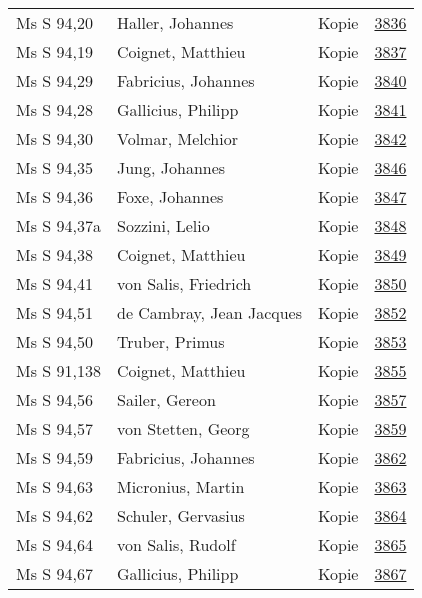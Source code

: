 \documentclass[10pt,a4paper,landscape]{report}
\begin{document}
\begin{longtable}{p{16cm}p{4cm}lr}
Ms S 94,20	&	Haller, Johannes	&	Kopie	&	\href{http://130.60.24.72/assignment/3836}{3836}\\
Ms S 94,19	&	Coignet, Matthieu	&	Kopie	&	\href{http://130.60.24.72/assignment/3837}{3837}\\
Ms S 94,29	&	Fabricius, Johannes	&	Kopie	&	\href{http://130.60.24.72/assignment/3840}{3840}\\
Ms S 94,28	&	Gallicius, Philipp	&	Kopie	&	\href{http://130.60.24.72/assignment/3841}{3841}\\
Ms S 94,30	&	Volmar, Melchior	&	Kopie	&	\href{http://130.60.24.72/assignment/3842}{3842}\\
Ms S 94,35	&	Jung, Johannes	&	Kopie	&	\href{http://130.60.24.72/assignment/3846}{3846}\\
Ms S 94,36	&	Foxe, Johannes	&	Kopie	&	\href{http://130.60.24.72/assignment/3847}{3847}\\
Ms S 94,37a	&	Sozzini, Lelio	&	Kopie	&	\href{http://130.60.24.72/assignment/3848}{3848}\\
Ms S 94,38	&	Coignet, Matthieu	&	Kopie	&	\href{http://130.60.24.72/assignment/3849}{3849}\\
Ms S 94,41	&	von Salis, Friedrich	&	Kopie	&	\href{http://130.60.24.72/assignment/3850}{3850}\\
Ms S 94,51	&	de Cambray, Jean Jacques	&	Kopie	&	\href{http://130.60.24.72/assignment/3852}{3852}\\
Ms S 94,50	&	Truber, Primus	&	Kopie	&	\href{http://130.60.24.72/assignment/3853}{3853}\\
Ms S 91,138	&	Coignet, Matthieu	&	Kopie	&	\href{http://130.60.24.72/assignment/3855}{3855}\\
Ms S 94,56	&	Sailer, Gereon	&	Kopie	&	\href{http://130.60.24.72/assignment/3857}{3857}\\
Ms S 94,57	&	von Stetten, Georg	&	Kopie	&	\href{http://130.60.24.72/assignment/3859}{3859}\\
Ms S 94,59	&	Fabricius, Johannes	&	Kopie	&	\href{http://130.60.24.72/assignment/3862}{3862}\\
Ms S 94,63	&	Micronius, Martin	&	Kopie	&	\href{http://130.60.24.72/assignment/3863}{3863}\\
Ms S 94,62	&	Schuler, Gervasius	&	Kopie	&	\href{http://130.60.24.72/assignment/3864}{3864}\\
Ms S 94,64	&	von Salis, Rudolf	&	Kopie	&	\href{http://130.60.24.72/assignment/3865}{3865}\\
Ms S 94,67	&	Gallicius, Philipp	&	Kopie	&	\href{http://130.60.24.72/assignment/3867}{3867}\\

\end{longtable}
\end{document}
